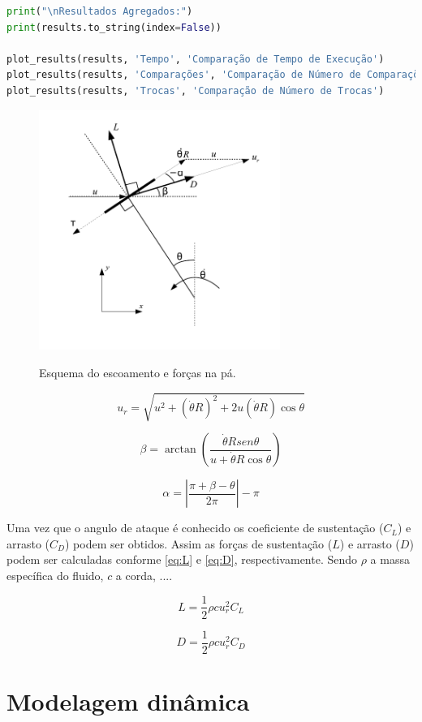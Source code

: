 \begin{lstlisting}[language=Python, caption={Código de implementação do algoritmo de implementação do Quicksort, Heapsort e Shellsort}]
print("\nResultados Agregados:")
print(results.to_string(index=False))

plot_results(results, 'Tempo', 'Comparação de Tempo de Execução')
plot_results(results, 'Comparações', 'Comparação de Número de Comparações')
plot_results(results, 'Trocas', 'Comparação de Número de Trocas')
\end{lstlisting}

\begin{figure}
	\centering
	\caption{Esquema do escoamento e forças na pá.}
	\includegraphics[width=0.7\textwidth]{figuras/EsquemaVelocidade.pdf}
	\label{fig:EsquemaVelocidade}
\end{figure}

\begin{equation}
{u_r} = \sqrt {{u^2} + {{(\dot \theta R)}^2} + 2u(\dot \theta R)\cos \theta }
\label{eq:Vrelativa}
\end{equation}

\begin{equation}
\beta  = \arctan \left( {\frac{{\dot \theta Rsen\theta }}{{u + \dot \theta R\cos \theta }}} \right)
\label{eq:beta}
\end{equation}

\begin{equation}
\alpha  = \left| {\frac{{\pi  + \beta  - \theta }}{{2\pi }}} \right| - \pi
\label{eq:alfa}
\end{equation}

Uma vez que o angulo de ataque é conhecido os coeficiente de sustentação ($C_L$) e arrasto ($C_D$) podem ser obtidos. Assim as forças de sustentação ($L$) e arrasto ($D$) podem ser calculadas conforme \autoref{eq:L} e \autoref{eq:D}, respectivamente. Sendo $\rho$ a massa específica do fluido, $c$ a corda, ....

\begin{equation}
L = \frac{1}{2}\rho cu_r^2{C_L}
\label{eq:L}
\end{equation}

\begin{equation}
D = \frac{1}{2}\rho cu_r^2{C_D}
\label{eq:D}
\end{equation}


\section{Modelagem dinâmica}
\label{sec:modelagemdinamica}
